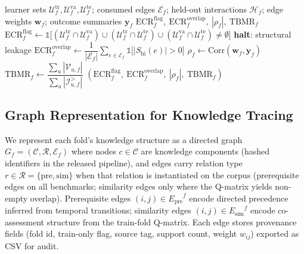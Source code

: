 \documentclass[pdflatex,sn-mathphys-num]{sn-jnl}
\newcommand{\Epre}{\ensuremath{E_{\text{pre}}}}
\newcommand{\Esim}{\ensuremath{E_{\text{sim}}}}
\newcommand{\KCs}{knowledge components}
\begin{document}
\begin{algorithm}[t]
\caption{Edge-provenance leakage audit for fold $f$}
\label{alg:leak-audit}
\begin{algorithmic}[1]
\Require learner sets $\mathcal{U}^{\mathrm{tr}}_f,\mathcal{U}^{\mathrm{va}}_f,\mathcal{U}^{\mathrm{te}}_f$;
  consumed edges $\mathcal{E}_f$; held-out interactions $\mathcal{H}_f$;
  edge weights $\mathbf{w}_f$; outcome summaries $\mathbf{y}_f$
\Ensure $\mathrm{ECR}^{\mathrm{flag}}_f,\ \mathrm{ECR}^{\mathrm{overlap}}_f,\ |\rho_f|,\ \mathrm{TBMR}_f$
\State $\mathrm{ECR}^{\mathrm{flag}}_f \gets \mathbb{1}\big[(\mathcal{U}^{\mathrm{tr}}_f\cap\mathcal{U}^{\mathrm{va}}_f)\cup(\mathcal{U}^{\mathrm{tr}}_f\cap\mathcal{U}^{\mathrm{te}}_f)\cup(\mathcal{U}^{\mathrm{va}}_f\cap\mathcal{U}^{\mathrm{te}}_f)\neq\emptyset\big]$
 \State \textbf{halt}: structural leakage \EndIf
\State $\mathrm{ECR}^{\mathrm{overlap}}_f \gets \dfrac{1}{|\mathcal{E}_f|}\sum_{e\in\mathcal{E}_f}\mathbb{1}\big[|S_{\text{hi}}(e)|>0\big]$ 
\State $\rho_f \gets \mathrm{Corr}(\mathbf{w}_f,\mathbf{y}_f)$ 
\State $\mathrm{TBMR}_f \gets \dfrac{\sum_u |\mathcal{V}_{u,f}|}{\sum_u |\mathcal{I}^{>}_{u,f}|}$ 
\State \Return $(\mathrm{ECR}^{\mathrm{flag}}_f,\ \mathrm{ECR}^{\mathrm{overlap}}_f,\ |\rho_f|,\ \mathrm{TBMR}_f)$
\end{algorithmic}
\end{algorithm}

\subsection{Graph Representation for Knowledge Tracing}
\label{sec:graph-repr}
We represent each fold's knowledge structure as a directed graph
$G_f=(\mathcal{C},\mathcal{R},\mathcal{E}_f)$ where nodes $c\in\mathcal{C}$
are \KCs{} (hashed identifiers in the released pipeline), and edges carry
relation type $r\in\mathcal{R}=\{\text{pre}, \text{sim}\}$ when that
relation is instantiated on the corpus (prerequisite edges on all benchmarks;
similarity edges only where the Q-matrix yields non-empty overlap). Prerequisite edges $(i,j)\in\Epre^f$ encode directed
precedence inferred from temporal transitions; similarity edges
$(i,j)\in\Esim^f$ encode co-assessment structure from the train-fold
Q-matrix. Each edge stores provenance fields (fold id, train-only flag,
source tag, support count, weight $w_{ij}$) exported as CSV for audit.
\end{document}
